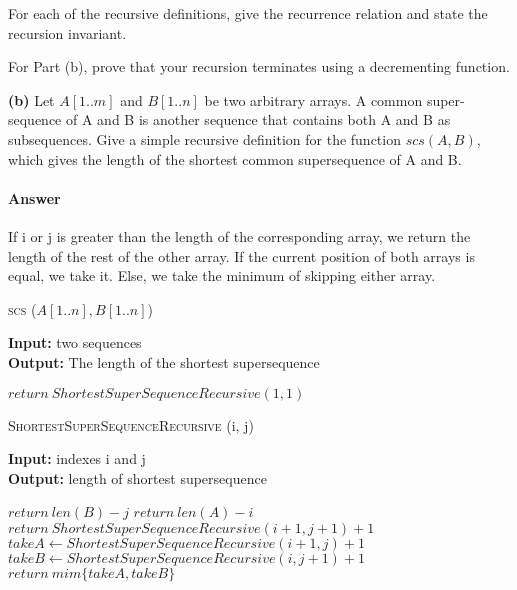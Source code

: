 \documentclass{article}
\begin{document}



For each of the recursive definitions, give the recurrence
relation and state the recursion invariant.

For Part (b), prove that your recursion terminates
using a decrementing function.

{\bf (b)} Let $A[1.. m]$ and $B[1.. n]$ be two arbitrary arrays. A common super-
sequence of A and B is another sequence that contains both A and B
as subsequences. Give a simple recursive definition for the function
$scs(A, B)$, which gives the length of the shortest common supersequence
of A and B.

\paragraph{Answer}

If i or j is greater than the length of the corresponding array, we return the
length of the rest of the other array. If the current position of both arrays is
equal, we take it. Else, we take the minimum of skipping either array.

\begin{algorithm} \caption{\textsc{scs} ($A[1..n], B[1..n]$)}\label{alg:seb}
    {\bf Input:} two sequences\\
    {\bf Output:} The length of the shortest supersequence
    \begin{algorithmic}[1]
        \State$return\ ShortestSuperSequenceRecursive(1, 1)$
    \end{algorithmic}
\end{algorithm}

\begin{algorithm} \caption{\textsc{ShortestSuperSequenceRecursive} (i, j)}\label{alg:seb}
    {\bf Input:} indexes i and j\\
    {\bf Output:} length of shortest supersequence
    \begin{algorithmic}[1]
            \State$return\ len(B) - j$
            \State$return\ len(A) - i$
            \State$return\ ShortestSuperSequenceRecursive(i+1, j+1) +1$
        \EndIf{}
        \State$takeA \gets ShortestSuperSequenceRecursive(i+1, j) +1$
        \State$takeB \gets ShortestSuperSequenceRecursive(i, j+1) +1$
        \State$return\ mim\{takeA, takeB\}$
    \end{algorithmic}
\end{algorithm}
\end{document}
